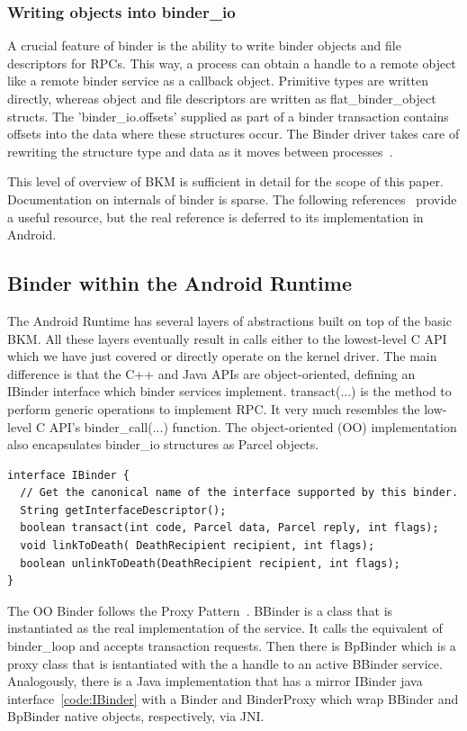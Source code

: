 \documentclass[prodmode]{acmlarge}
\begin{document}
\subsubsection{Writing objects into binder\_io}
A crucial feature of binder is the ability to write binder objects and file descriptors for RPCs. This way, a process can obtain a handle to a remote object like a remote binder service as a callback object. Primitive types are written directly, whereas object and file descriptors are written as flat\_binder\_object structs. The 'binder\_io.offsets' supplied as part of a binder transaction contains offsets into the data where these structures occur. The Binder driver takes care of rewriting the structure type and data as it moves between processes~\cite{BinderSourceComment}.

This level of overview of BKM is sufficient in detail for the scope of this paper. Documentation on internals of binder is sparse. The following references~\cite{BinderLinuxFoundation,BinderMastersThesis} provide a useful resource, but the real reference is deferred to its implementation in Android.

\subsection{Binder within the Android Runtime}
The Android Runtime has several layers of abstractions built on top of the basic BKM. All these layers eventually result in calls either to the lowest-level C API which we have just covered or directly operate on the kernel driver. The main difference is that the C++ and Java APIs are object-oriented, defining an IBinder interface which binder services implement. transact(...) is the method to perform generic operations to implement RPC. It very much resembles the low-level C API's binder\_call(...) function. The object-oriented (OO) implementation also encapsulates binder\_io structures as Parcel objects.

\begin{Verbatim}[samepage=true]
interface IBinder {
  // Get the canonical name of the interface supported by this binder.
  String getInterfaceDescriptor(); 
  boolean transact(int code, Parcel data, Parcel reply, int flags);
  void linkToDeath( DeathRecipient recipient, int flags);
  boolean unlinkToDeath(DeathRecipient recipient, int flags);
}
\end{Verbatim}

The OO Binder follows the Proxy Pattern~\cite{ProxyPattern}. BBinder is a class that is instantiated as the real implementation of the service. It calls the equivalent of binder\_loop and accepts transaction requests. Then there is BpBinder which is a proxy class that is isntantiated with the a handle to an active BBinder service. Analogously, there is a Java implementation that has a mirror IBinder java interface~\ref{code:IBinder} with a Binder and BinderProxy which wrap BBinder and BpBinder native objects, respectively, via JNI.
\end{document}
